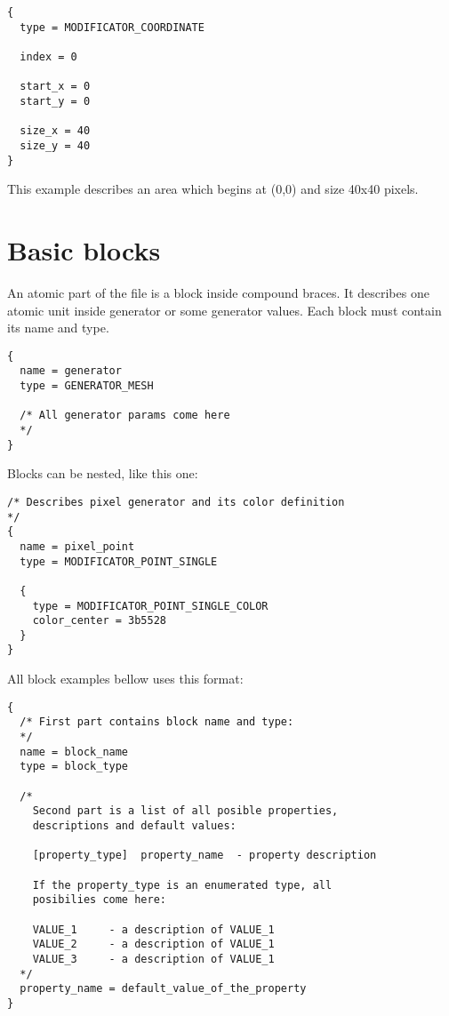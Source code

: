 \documentclass[11pt]{article}
\begin{document}
\begin{verbatim}
{
  type = MODIFICATOR_COORDINATE

  index = 0

  start_x = 0
  start_y = 0

  size_x = 40
  size_y = 40
}
\end{verbatim}

This example describes an area which begins at (0,0) and size 40x40 pixels.

\section{Basic blocks}

An atomic part of the file is a block inside compound braces. It describes one 
atomic unit inside generator or some generator values. Each block must
contain its name and type.

\begin{verbatim}
{
  name = generator
  type = GENERATOR_MESH

  /* All generator params come here
  */
}
\end{verbatim}

Blocks can be nested, like this one:

\begin{verbatim}
/* Describes pixel generator and its color definition
*/
{
  name = pixel_point
  type = MODIFICATOR_POINT_SINGLE

  {
    type = MODIFICATOR_POINT_SINGLE_COLOR
    color_center = 3b5528
  }
}
\end{verbatim}

All block examples bellow uses this format:

\begin{verbatim}
{
  /* First part contains block name and type:
  */
  name = block_name
  type = block_type

  /*
    Second part is a list of all posible properties,
    descriptions and default values:

    [property_type]  property_name  - property description
   
    If the property_type is an enumerated type, all 
    posibilies come here:
    
    VALUE_1     - a description of VALUE_1
    VALUE_2     - a description of VALUE_1
    VALUE_3     - a description of VALUE_1
  */  
  property_name = default_value_of_the_property  
}
\end{verbatim}
\end{document}
